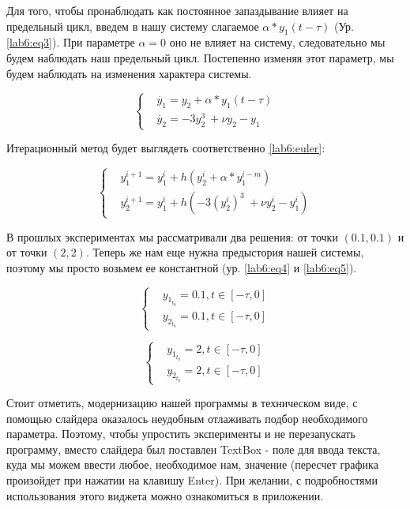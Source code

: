 \clearpage
Для того, чтобы пронаблюдать как постоянное запаздывание
влияет на предельный цикл, введем в нашу систему слагаемое
$\alpha * y_1(t-\tau)$ (Ур. \eqref{lab6:eq3}). При параметре
$\alpha = 0$ оно не влияет на систему, следовательно мы будем
наблюдать наш предельный цикл. Постепенно изменяя этот параметр,
мы будем наблюдать на изменения характера системы.

\begin{equation}\label{lab6:eq3}
\begin{cases}
    &\dot{y_1} = y_2 + \alpha * y_1(t-\tau)\\
    &\dot{y_2} = -3y_2^3\ + \nu y_2 - y_1
\end{cases}
\end{equation}

Итерационный метод будет выглядеть соответственно \eqref{lab6:euler}:

\begin{equation}
    \begin{cases}
        &y_1^{i+1} = y_1^i + h(y_2^i + \alpha * y_1^{i-m})\\
        &y_2^{i+1} = y_1^i + h(-3(y_2^i)^3\ + \nu y_2^i - y_1^i)
    \end{cases}
\end{equation}

В прошлых экспериментах мы рассматривали два решения: от точки
$(0.1, 0.1)$ и от точки $(2, 2)$. Теперь же нам еще нужна
предыстория нашей системы, поэтому мы просто возьмем ее константной
(ур. \eqref{lab6:eq4} и \eqref{lab6:eq5}).

\begin{equation}\label{lab6:eq4}
  \begin{cases}
    &y_{1_{t_0}} = 0.1, t \in [-\tau, 0]\\
    &y_{2_{t_0}} = 0.1, t \in [-\tau, 0]
  \end{cases}
\end{equation}

\begin{equation}\label{lab6:eq5}
  \begin{cases}
    &y_{1_{t_0}} = 2, t \in [-\tau, 0]\\
    &y_{2_{t_0}} = 2, t \in [-\tau, 0]
  \end{cases}
\end{equation}

Стоит отметить, модернизацию нашей программы в техническом
виде, с помощью слайдера оказалось неудобным отлаживать
подбор необходимого параметра. Поэтому, чтобы упростить
эксперименты и не перезапускать программу, вместо слайдера
был поставлен \textmd{TextBox} - поле для ввода текста, куда мы
можем ввести любое, необходимое нам, значение (пересчет
графика произойдет при нажатии на клавишу \textmd{Enter}).
При желании, с подробностями использования этого виджета
можно ознакомиться в приложении.

